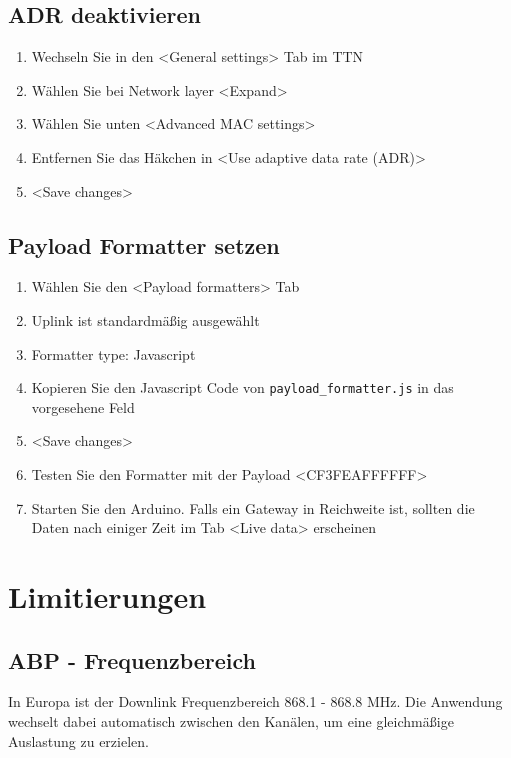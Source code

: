 \documentclass[12pt]{article}
\begin{document}
    \subsection{ADR deaktivieren} \label{subsec:ADR deaktivieren}
      \begin{enumerate}
        \item Wechseln Sie in den \textless General settings\textgreater{} Tab im TTN
        \item Wählen Sie bei Network layer \textless Expand\textgreater{}
        \item Wählen Sie unten \textless Advanced MAC settings\textgreater{}
        \item Entfernen Sie das Häkchen in \textless Use adaptive data rate (ADR)\textgreater{}
        \item \textless Save changes\textgreater{}
      \end{enumerate}


    
    \subsection{Payload Formatter setzen} \label{subsec:Payload Formatter setzen}
    \begin{enumerate}
      \item Wählen Sie den \textless Payload formatters\textgreater{} Tab
      \item Uplink ist standardmäßig ausgewählt
      \item Formatter type: Javascript
      \item Kopieren Sie den Javascript Code von \texttt{payload\_formatter.js} in das vorgesehene Feld
      \item \textless Save changes\textgreater{}
      \item Testen Sie den Formatter mit der Payload \textless CF3FEAFFFFFF\textgreater{}
      \item Starten Sie den Arduino. Falls ein Gateway in Reichweite ist, sollten die Daten nach einiger
        Zeit im Tab \textless Live data\textgreater{} erscheinen
    \end{enumerate}



  \section{Limitierungen}

      \subsection{ABP - Frequenzbereich} \label{subsec:ABP - Frequenzbereich}
        In Europa ist der Downlink Frequenzbereich 868.1 - 868.8 MHz.
        Die Anwendung wechselt dabei automatisch zwischen den Kanälen, um eine gleichmäßige Auslastung zu erzielen.
\end{document}
